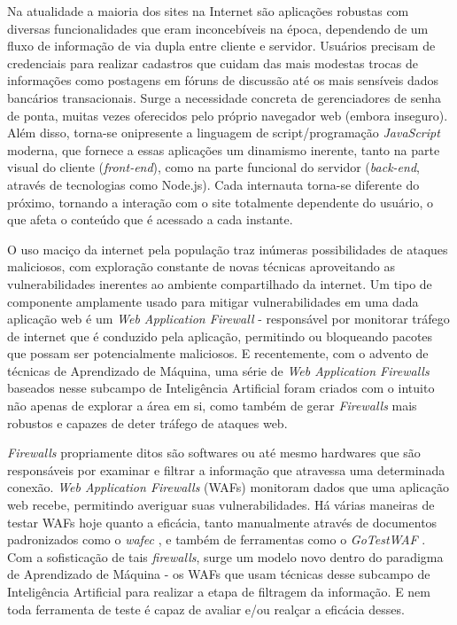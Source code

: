 Na atualidade a maioria dos sites na Internet são aplicações robustas com diversas funcionalidades que eram inconcebíveis na época, dependendo de um fluxo de informação de via dupla entre cliente e servidor. Usuários precisam de credenciais para realizar cadastros que cuidam das mais modestas trocas de informações como postagens em fóruns de discussão até os mais sensíveis dados bancários transacionais. Surge a necessidade concreta de gerenciadores de senha de ponta, muitas vezes oferecidos pelo próprio navegador web (embora inseguro). Além disso, torna-se onipresente a linguagem de script/programação \textit{JavaScript} moderna, que fornece a essas aplicações um dinamismo inerente, tanto na parte visual do cliente (\textit{front-end}), como na parte funcional do servidor (\textit{back-end}, através de tecnologias como Node.js). Cada internauta torna-se diferente do próximo, tornando a interação com o site totalmente dependente do usuário, o que afeta o conteúdo que é acessado a cada instante.

O uso maciço da internet pela população traz inúmeras possibilidades de ataques maliciosos, com exploração constante de novas técnicas aproveitando as vulnerabilidades inerentes ao ambiente compartilhado da internet. Um tipo de componente amplamente usado para mitigar vulnerabilidades em uma dada aplicação web é um \textit{Web Application Firewall} - responsável por monitorar tráfego de internet que é conduzido pela aplicação, permitindo ou bloqueando pacotes que possam ser potencialmente maliciosos. E recentemente, com o advento de técnicas de Aprendizado de Máquina, uma série de \textit{Web Application Firewalls} baseados nesse subcampo de Inteligência Artificial foram criados com o intuito não apenas de explorar a área em si, como também de gerar \textit{Firewalls} mais robustos e capazes de deter tráfego de ataques web. 

\textit{Firewalls} propriamente ditos são softwares ou até mesmo hardwares que são responsáveis por examinar e filtrar a informação que atravessa uma determinada conexão. \textit{Web Application Firewalls} (WAFs) monitoram dados que uma aplicação web recebe, permitindo averiguar suas vulnerabilidades. Há várias maneiras de testar WAFs hoje quanto a eficácia, tanto manualmente através de documentos padronizados como o \textit{wafec} \cite{wafec_doc}, e também de ferramentas como o \textit{GoTestWAF} \cite{gotestwaf_wallarm}. Com a sofisticação de tais \textit{firewalls}, surge um modelo novo dentro do paradigma de Aprendizado de Máquina - os WAFs que usam técnicas desse subcampo de Inteligência Artificial para realizar a etapa de filtragem da informação. E nem toda ferramenta de teste é capaz de avaliar e/ou realçar a eficácia desses.

